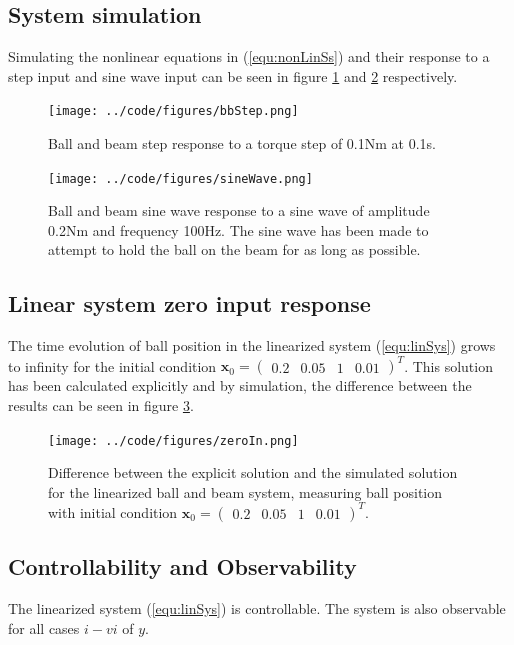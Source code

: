 \documentclass[a4paper, titlepage]{article}
\begin{document}
\subsection{System simulation}
Simulating the nonlinear equations in (\ref{equ:nonLinSs}) and their response to a step input and sine wave input can be seen in figure \ref{fig:bbStep} and \ref{fig:sineWave} respectively.

\begin{figure}[H]
\center
\texttt{[image: ../code/figures/bbStep.png]}
\caption{Ball and beam step response to a torque step of 0.1Nm at 0.1s.}
\label{fig:bbStep}
\end{figure}

\begin{figure}[H]
\center
\texttt{[image: ../code/figures/sineWave.png]}
\caption{Ball and beam sine wave response to a sine wave of amplitude 0.2Nm and frequency 100Hz. The sine wave has been made to attempt to hold the ball on the beam for as long as possible.}
\label{fig:sineWave}
\end{figure}

\subsection{Linear system zero input response}
The time evolution of ball position in the linearized system (\ref{equ:linSys}) grows to infinity for the initial condition $\textbf{x}_0 = \begin{pmatrix} 0.2 & 0.05 & 1 & 0.01 \end{pmatrix}^T$.
This solution has been calculated explicitly and by simulation, the difference between the results can be seen in figure \ref{fig:zeroIn}.

\begin{figure}[H]
\center
\texttt{[image: ../code/figures/zeroIn.png]}
\caption{Difference between the explicit solution and the simulated solution for the linearized ball and beam system, measuring ball position with initial condition $\textbf{x}_0 = \begin{pmatrix} 0.2 & 0.05 & 1 & 0.01 \end{pmatrix}^T$.}
\label{fig:zeroIn}
\end{figure}

\subsection{Controllability and Observability}
The linearized system (\ref{equ:linSys}) is controllable.
The system is also observable for all cases $i - vi$ of $y$.
\end{document}

